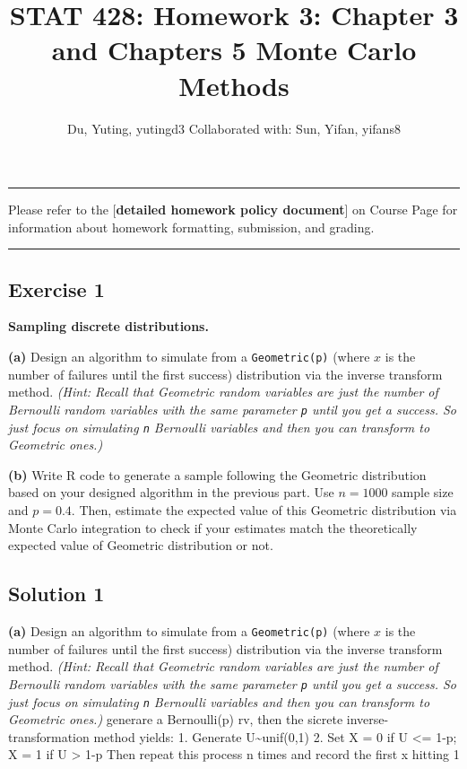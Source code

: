 \documentclass[
]{article}
\title{STAT 428: Homework 3: Chapter 3 and Chapters 5 Monte Carlo Methods}
\author{Du, Yuting, yutingd3 Collaborated with: Sun, Yifan, yifans8}
\date{}
\begin{document}
\maketitle

{
\setcounter{tocdepth}{2}
\tableofcontents
}
\begin{center}\rule{0.5\linewidth}{\linethickness}\end{center}

Please refer to the {[}\textbf{detailed homework policy document}{]} on
Course Page for information about homework formatting, submission, and
grading.

\begin{center}\rule{0.5\linewidth}{\linethickness}\end{center}

\hypertarget{exercise-1}{%
\subsection{Exercise 1}\label{exercise-1}}

\textbf{Sampling discrete distributions.}

\textbf{(a)} Design an algorithm to simulate from a
\texttt{Geometric(p)} (where \(x\) is the number of failures until the
first success) distribution via the inverse transform method.
\emph{(Hint: Recall that Geometric random variables are just the number
of Bernoulli random variables with the same parameter \texttt{p} until
you get a success. So just focus on simulating \texttt{n} Bernoulli
variables and then you can transform to Geometric ones.)}

\textbf{(b)} Write R code to generate a sample following the Geometric
distribution based on your designed algorithm in the previous part. Use
\(n=1000\) sample size and \(p=0.4\). Then, estimate the expected value
of this Geometric distribution via Monte Carlo integration to check if
your estimates match the theoretically expected value of Geometric
distribution or not.

\hypertarget{solution-1}{%
\subsection{Solution 1}\label{solution-1}}

\textbf{(a)} Design an algorithm to simulate from a
\texttt{Geometric(p)} (where \(x\) is the number of failures until the
first success) distribution via the inverse transform method.
\emph{(Hint: Recall that Geometric random variables are just the number
of Bernoulli random variables with the same parameter \texttt{p} until
you get a success. So just focus on simulating \texttt{n} Bernoulli
variables and then you can transform to Geometric ones.)} generare a
Bernoulli(p) rv, then the sicrete inverse-transformation method yields:
1. Generate U\textasciitilde unif(0,1) 2. Set X = 0 if U \textless= 1-p;
X = 1 if U \textgreater{} 1-p Then repeat this process n times and
record the first x hitting 1
\end{document}
